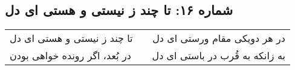 \begin{center}
\section*{شماره ۱۶: تا چند ز نیستی و هستی ای دل}
\label{sec:016}
\begin{longtable}{l p{0.5cm} r}
تا چند ز نیستی و هستی ای دل
&&
در هر دویکی مقام ورستی ای دل
\\
در بُعد، اگر رونده خواهی بودن
&&
به زانکه به قُرب در باستی ای دل
\\
\end{longtable}
\end{center}
